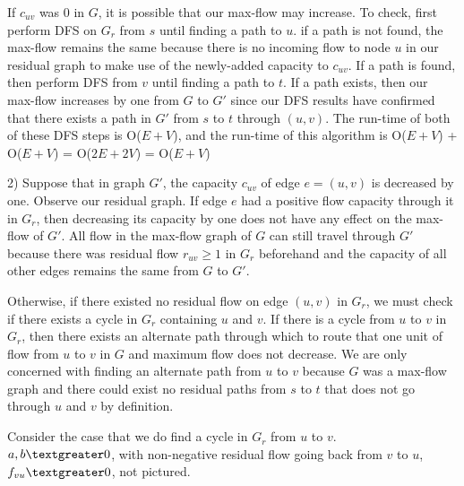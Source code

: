 \documentclass[11pt]{article}
\begin{document}
\begin{enumerate}
If $c_{uv}$ was 0 in $G$, it is possible that our max-flow may increase. To check, first perform DFS on $G_r$ from $s$ until finding a path to $u$. if a path is not found, the max-flow remains the same because there is no incoming flow to node $u$ in our residual graph to make use of the newly-added capacity to $c_{uv}$. If a path is found, then perform DFS from $v$ until finding a path to $t$. If a path exists, then our max-flow increases by one from $G$ to $G'$ since our DFS results have confirmed that there exists a path in $G'$ from $s$ to $t$ through $(u,v)$. The run-time of both of these DFS steps is O($E + V$), and the run-time of this algorithm is O($E + V$) + O($E + V$) = O($2E + 2V$) = O($E + V$)

2) Suppose that in graph $G'$, the capacity $c_{uv}$ of edge $e = (u,v)$ is decreased by one. Observe our residual graph. If edge $e$ had a positive flow capacity through it in $G_r$, then decreasing its capacity by one does not have any effect on the max-flow of $G'$. All flow in the max-flow graph of $G$ can still travel through $G'$ because there was residual flow $r_{uv} \geq 1$ in $G_r$ beforehand and the capacity of all other edges remains the same from $G$ to $G'$.

Otherwise, if there existed no residual flow on edge $(u,v)$ in $G_r$, we must check if there exists a cycle in $G_r$ containing $u$ and $v$. If there is a cycle from $u$ to $v$ in $G_r$, then there exists an alternate path through which to route that one unit of flow from $u$ to $v$ in $G$ and maximum flow does not decrease. We are only concerned with finding an alternate path from $u$ to $v$ because $G$ was a max-flow graph and there could exist no residual paths from $s$ to $t$ that does not go through $u$ and $v$ by definition.

Consider the case that we do find a cycle in $G_r$ from $u$ to $v$. \\
$a,b \textgreater 0$, with non-negative residual flow going back from $v$ to $u$, $f_{vu} \textgreater 0$, not pictured.



\end{enumerate}
\end{document}
